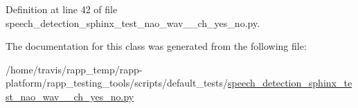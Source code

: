 Definition at line 42 of file speech\-\_\-detection\-\_\-sphinx\-\_\-test\-\_\-nao\-\_\-wav\-\_\-\_\-ch\-\_\-yes\-\_\-no.\-py.



The documentation for this class was generated from the following file\-:\begin{DoxyCompactItemize}
\item 
/home/travis/rapp\-\_\-temp/rapp-\/platform/rapp\-\_\-testing\-\_\-tools/scripts/default\-\_\-tests/\hyperlink{speech__detection__sphinx__test__nao__wav__1__ch__yes__no_8py}{speech\-\_\-detection\-\_\-sphinx\-\_\-test\-\_\-nao\-\_\-wav\-\_\-\_\-ch\-\_\-yes\-\_\-no.\-py}\end{DoxyCompactItemize}
